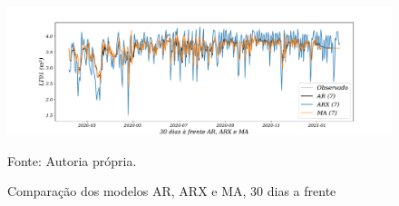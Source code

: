 \begin{figure}[H]
	\centering
	\caption{Comparação dos modelos AR, ARX e MA, 30 dias a frente }
	\label{fig:60-AR-ARX-MA24}
	\includegraphics[width=1\linewidth]{Apendices/Figuras/modelagem-24h/30-AR-ARX-MA}
	
	Fonte: Autoria própria.
\end{figure}

